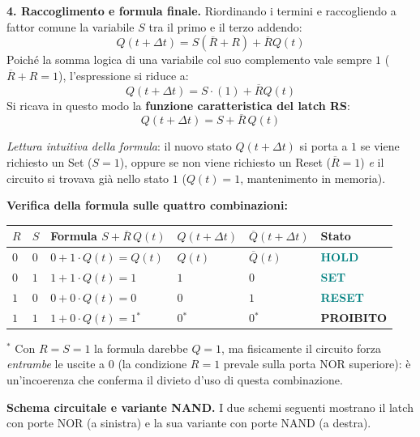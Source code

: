 \medskip
\noindent\textbf{4. Raccoglimento e formula finale.}
Riordinando i termini e raccogliendo a fattor comune la variabile $S$ tra il primo e il terzo addendo:
\[
Q(t+\Delta t) = S(\overline{R} + R) + \overline{R}Q(t)
\]
Poiché la somma logica di una variabile col suo complemento vale sempre $1$ ($\overline{R} + R = 1$), l'espressione si riduce a:
\[
Q(t+\Delta t) = S \cdot (1) + \overline{R}Q(t)
\]
Si ricava in questo modo la \textbf{funzione caratteristica del latch RS}:
\[
\boxed{Q(t+\Delta t) = S + \overline{R}\,Q(t)}
\]

\noindent\textit{Lettura intuitiva della formula}: il nuovo stato $Q(t+\Delta t)$ si porta a $1$ se viene richiesto un Set ($S=1$), oppure se non viene richiesto un Reset ($\overline{R}=1$) \emph{e} il circuito si trovava già nello stato $1$ ($Q(t)=1$, mantenimento in memoria).

\medskip
\noindent\textbf{Verifica della formula sulle quattro combinazioni:}

\begin{center}
\renewcommand{\arraystretch}{1.35}
\begin{tabular}{>{\centering}m{0.8cm}>{\centering}m{0.8cm}|>{\centering}m{2.2cm}|>{\centering}m{1.5cm}>{\centering}m{1.8cm}|l}
\toprule
$R$ & $S$ & Formula $S+\overline{R}\,Q(t)$ & $Q(t{+}\Delta t)$ & $\overline{Q}(t{+}\Delta t)$ & \textbf{Stato}\\
\midrule
$0$ & $0$ & $0 + 1\cdot Q(t) = Q(t)$         & $Q(t)$  & $\overline{Q}(t)$ & \textcolor{teal}{\textbf{HOLD}}\\
$0$ & $1$ & $1 + 1\cdot Q(t) = 1$             & $1$     & $0$               & \textcolor{teal}{\textbf{SET}}\\
$1$ & $0$ & $0 + 0\cdot Q(t) = 0$             & $0$     & $1$               & \textcolor{teal}{\textbf{RESET}}\\
\rowcolor{red!8}$1$ & $1$ & $1 + 0\cdot Q(t) = 1$\;$^*$    & $0$\;$^*$ & $0$\;$^*$     & \textcolor{red!70!black}{\textbf{PROIBITO}}\\
\bottomrule
\end{tabular}
\end{center}

{\small $^*$ Con $R=S=1$ la formula darebbe $Q=1$, ma fisicamente il circuito forza
\emph{entrambe} le uscite a $0$ (la condizione $R=1$ prevale sulla porta NOR superiore):
è un'incoerenza che conferma il divieto d'uso di questa combinazione.}

\bigskip
\noindent\textbf{Schema circuitale e variante NAND.}
I due schemi seguenti mostrano il latch con porte NOR (a sinistra) e la sua
variante con porte NAND (a destra).

